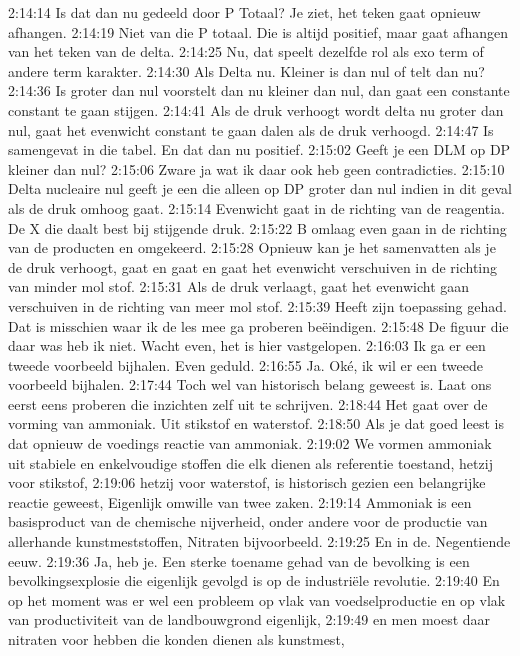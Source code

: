 2:14:14
Is dat dan nu gedeeld door P Totaal? Je ziet, het teken gaat opnieuw afhangen.
2:14:19
Niet van die P totaal. Die is altijd positief, maar gaat afhangen van het teken van de delta.
2:14:25
Nu, dat speelt dezelfde rol als exo term of andere term karakter.
2:14:30
Als Delta nu. Kleiner is dan nul of telt dan nu?
2:14:36
Is groter dan nul voorstelt dan nu kleiner dan nul, dan gaat een constante constant te gaan stijgen.
2:14:41
Als de druk verhoogt wordt delta nu groter dan nul, gaat het evenwicht constant te gaan dalen als de druk verhoogd.
2:14:47
Is samengevat in die tabel. En dat dan nu positief.
2:15:02
Geeft je een DLM op DP kleiner dan nul?
2:15:06
Zware ja wat ik daar ook heb geen contradicties.
2:15:10
Delta nucleaire nul geeft je een die alleen op DP groter dan nul indien in dit geval als de druk omhoog gaat.
2:15:14
Evenwicht gaat in de richting van de reagentia. De X die daalt best bij stijgende druk.
2:15:22
B omlaag even gaan in de richting van de producten en omgekeerd.
2:15:28
Opnieuw kan je het samenvatten als je de druk verhoogt, gaat en gaat en gaat het evenwicht verschuiven in de richting van minder mol stof.
2:15:31
Als de druk verlaagt, gaat het evenwicht gaan verschuiven in de richting van meer mol stof.
2:15:39
Heeft zijn toepassing gehad. Dat is misschien waar ik de les mee ga proberen beëindigen.
2:15:48
De figuur die daar was heb ik niet. Wacht even, het is hier vastgelopen.
2:16:03
Ik ga er een tweede voorbeeld bijhalen. Even geduld.
2:16:55
Ja. Oké, ik wil er een tweede voorbeeld bijhalen.
2:17:44
Toch wel van historisch belang geweest is. Laat ons eerst eens proberen die inzichten zelf uit te schrijven.
2:18:44
Het gaat over de vorming van ammoniak. Uit stikstof en waterstof.
2:18:50
Als je dat goed leest is dat opnieuw de voedings reactie van ammoniak.
2:19:02
We vormen ammoniak uit stabiele en enkelvoudige stoffen die elk dienen als referentie toestand, hetzij voor stikstof,
2:19:06
hetzij voor waterstof, is historisch gezien een belangrijke reactie geweest, Eigenlijk omwille van twee zaken.
2:19:14
Ammoniak is een basisproduct van de chemische nijverheid, onder andere voor de productie van allerhande kunstmeststoffen, Nitraten bijvoorbeeld.
2:19:25
En in de. Negentiende eeuw.
2:19:36
Ja, heb je. Een sterke toename gehad van de bevolking is een bevolkingsexplosie die eigenlijk gevolgd is op de industriële revolutie.
2:19:40
En op het moment was er wel een probleem op vlak van voedselproductie en op vlak van productiviteit van de landbouwgrond eigenlijk,
2:19:49
en men moest daar nitraten voor hebben die konden dienen als kunstmest,
